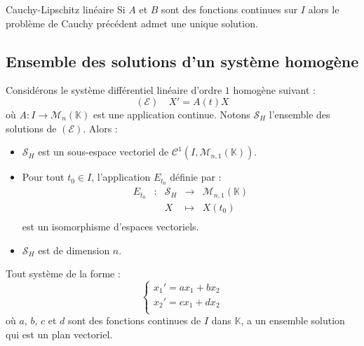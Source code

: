 \documentclass[french,11pt,twoside]{VcCours}
\begin{document}
\begin{Theoreme}{Cauchy-Lipschitz linéaire} Si $A$ et $B$ sont des fonctions continues sur $I$ alors le problème de Cauchy précédent admet une unique solution.
\end{Theoreme}

\subsection{Ensemble des solutions d'un système homogène}

\begin{Proposition}{} Considérons le système différentiel linéaire d'ordre $1$ homogène suivant :
$$ (\mathcal{E}) \quad X'=A(t)X$$
où $A : I \rightarrow \mathcal{M}_n(\mathbb{K})$ est une application continue. Notons $\mathcal{S}_H$ l'ensemble des solutions de $(\mathcal{E})$. Alors :

\begin{itemize}
\item $\mathcal{S}_H$ est un sous-espace vectoriel de $\mathcal{C}^1(I, \mathcal{M}_{n,1}(\mathbb{K}))$.
\item Pour tout $t_0 \in I$, l'application $E_{t_0}$ définie par :
$$ \begin{array}{cclll}
E_{t_0} & : & \mathcal{S}_H & \rightarrow & \mathcal{M}_{n,1}(\mathbb{K}) \\
& & X & \mapsto & X(t_0) \\
\end{array}$$
est un isomorphisme d'espaces vectoriels. 
\item $\mathcal{S}_H$ est de dimension $n$.
\end{itemize}
\end{Proposition}

\begin{Demonstration}{}

\newpage

\vspace*{3cm}
\end{Demonstration}

\begin{Exemple} Tout système de la forme :
$$ \left\lbrace \begin{array}{cclll}
x_1'= ax_1+bx_2 \\
x_2'= c x_1+dx_2 \\
\end{array}\right.$$
où $a$, $b$, $c$ et $d$ sont des fonctions continues de $I$ dans $\mathbb{K}$, a un ensemble solution qui est un plan vectoriel.
\end{Exemple}
\end{document}
